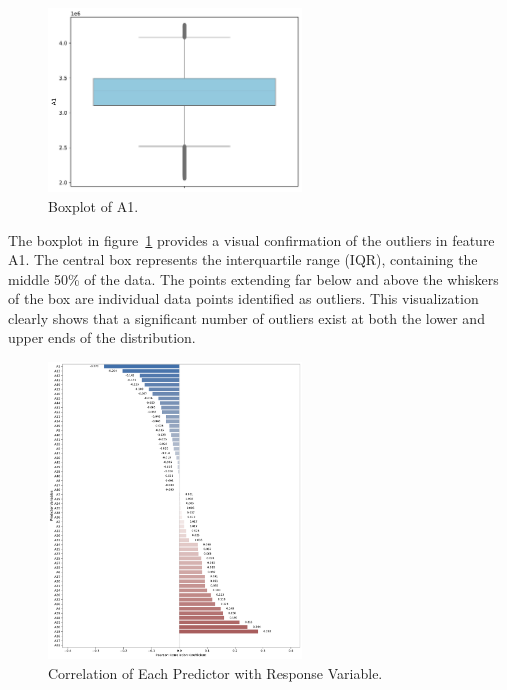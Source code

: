 \documentclass[11pt]{report}
\begin{document}

\begin{figure}[H]
    \centering
    \includegraphics[width=0.6\textwidth]{images/A1_boxplot.pdf}
    \caption{Boxplot of A1.}
    \label{fig:a1_boxplot}
\end{figure}

The boxplot in figure~\ref{fig:a1_boxplot} provides a visual confirmation of the outliers in feature A1. The central box represents the interquartile range (IQR), containing the middle 50\% of the data. The points extending far below and above the whiskers of the box are individual data points identified as outliers. This visualization clearly shows that a significant number of outliers exist at both the lower and upper ends of the distribution.

\begin{figure}[H]
    \centering
    \includegraphics[width=0.6\textwidth]{images/correlation_with_T.pdf}
    \caption{Correlation of Each Predictor with Response Variable.}
    \label{fig:correlation_with_T}
\end{figure}
\end{document}
